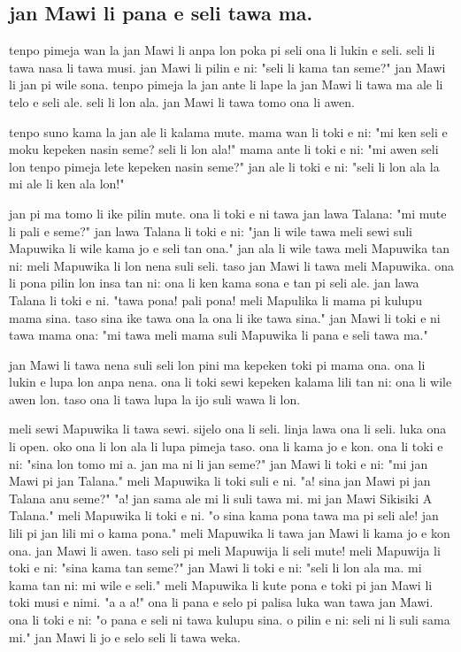 \newpage
\subsection{jan Mawi li pana e seli tawa ma.}

tenpo pimeja wan la jan Mawi li anpa lon poka pi seli ona li lukin e seli. 
seli li tawa nasa li tawa musi. 
jan Mawi li pilin e ni: "seli li kama tan seme?" 
jan Mawi li jan pi wile sona. 
tenpo pimeja la jan ante li lape la jan Mawi li tawa ma ale li telo e seli ale. 
seli li lon ala. 
jan Mawi li tawa tomo ona li awen.

tenpo suno kama la jan ale li kalama mute.
mama wan li toki e ni: "mi ken seli e moku kepeken nasin seme? 
seli li lon ala!"
mama ante li toki e ni: "mi awen seli lon tenpo pimeja lete kepeken nasin seme?"
jan ale li toki e ni: "seli li lon ala la mi ale li ken ala lon!"

jan pi ma tomo li ike pilin mute. 
ona li toki e ni tawa jan lawa Talana: "mi mute li pali e seme?"
jan lawa Talana li toki e ni: "jan li wile tawa meli sewi suli Mapuwika li wile kama jo e seli tan ona."
jan ala li wile tawa meli Mapuwika tan ni: meli Mapuwika li lon nena suli seli. 
taso jan Mawi li tawa meli Mapuwika. 
ona li pona pilin lon insa tan ni: ona li ken kama sona e tan pi seli ale.
jan lawa Talana li toki e ni. 
"tawa pona!
pali pona!
meli Mapulika li mama pi kulupu mama sina. 
taso sina ike tawa ona la ona li ike tawa sina."
jan Mawi li toki e ni tawa mama ona: "mi tawa meli mama suli Mapuwika li pana e seli tawa ma."

jan Mawi li tawa nena suli seli lon pini ma kepeken toki pi mama ona. 
ona li lukin e lupa lon anpa nena. 
ona li toki sewi kepeken kalama lili tan ni: ona li wile awen lon. 
taso ona li tawa lupa la ijo suli wawa li lon.

meli sewi Mapuwika li tawa sewi. 
sijelo ona li seli. 
linja lawa ona li seli. 
luka ona li open. 
oko ona li lon ala li lupa pimeja taso. 
ona li kama jo e kon.
ona li toki e ni: "sina lon tomo mi a. 
jan ma ni li jan seme?"
jan Mawi li toki e ni: "mi jan Mawi pi jan Talana."
meli Mapuwika li toki suli e ni. 
"a! 
sina jan Mawi pi jan Talana anu seme?"
"a! 
jan sama ale mi li suli tawa mi. 
mi jan Mawi Sikisiki A Talana."
meli Mapuwika li toki e ni. 
"o sina kama pona tawa ma pi seli ale! 
jan lili pi jan lili mi o kama pona."
meli Mapuwika li tawa jan Mawi li kama jo e kon ona. 
jan Mawi li awen. 
taso seli pi meli Mapuwija li seli mute!
meli Mapuwija li toki e ni: "sina kama tan seme?"
jan Mawi li toki e ni: "seli li lon ala ma. 
mi kama tan ni: mi wile e seli."
meli Mapuwika li kute pona e toki pi jan Mawi li toki musi e nimi. "a a a!" 
ona li pana e selo pi palisa luka wan tawa jan Mawi. 
ona li toki e ni: "o pana e seli ni tawa kulupu sina. 
o pilin e ni: seli ni li suli sama mi."
jan Mawi li jo e selo seli li tawa weka.

